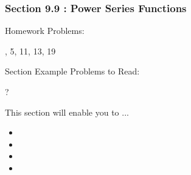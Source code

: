 %
%

\begin{frame}
\frametitle{\LARGE {\color[rgb]{0.02,0.20,1.0} Section 9.9 : Power Series Functions}}
\vspace{0.8cm}
\begin{block}{Homework Problems:}

\vspace{0.2cm}
, 5, 11, 13, 19
	
\end{block}
\vspace{0.5cm}

\begin{block}{Section Example Problems to Read:}

\vspace{0.2cm}
\centering
?
\end{block}
\vspace{0.3cm}

\begin{block}{This section will enable you to ...}
\begin{itemize}
	\item[...] 
	\item[...] 
	\item[...] 
	\item[...] 
\end{itemize}
\end{block}
\vspace{3.0cm}
\end{frame}
